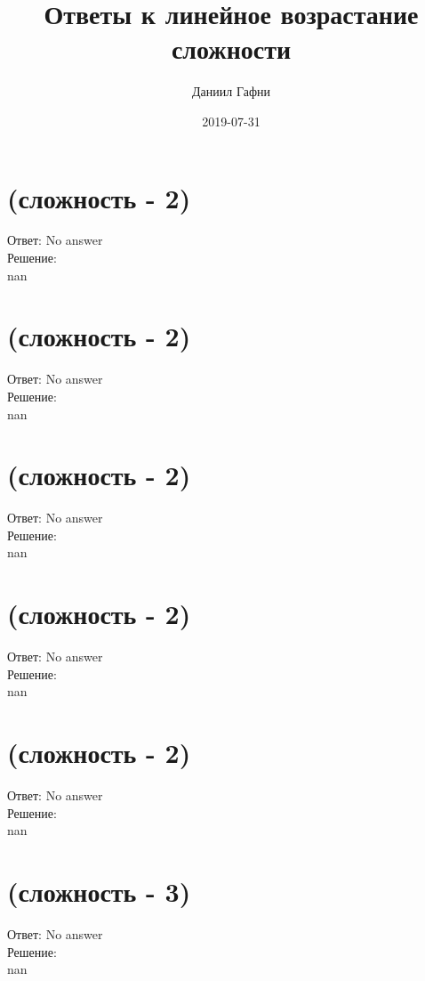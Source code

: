 \documentclass[a4paper,10pt]{article}%
\title{Ответы к линейное возрастание сложности}%
\author{Даниил Гафни}%
\date{2019{-}07{-}31}%
\begin{document}
%
\normalsize%
\maketitle%
\section{(сложность {-} 2)}%
\label{sec:( {-} 2)}%
\hspace{3ex} Ответ: No answer \\%
%
\hspace*{3ex} Решение: \\%
nan

%
\section{(сложность {-} 2)}%
\label{sec:( {-} 2)}%
\hspace{3ex} Ответ: No answer \\%
%
\hspace*{3ex} Решение: \\%
nan

%
\section{(сложность {-} 2)}%
\label{sec:( {-} 2)}%
\hspace{3ex} Ответ: No answer \\%
%
\hspace*{3ex} Решение: \\%
nan

%
\section{(сложность {-} 2)}%
\label{sec:( {-} 2)}%
\hspace{3ex} Ответ: No answer \\%
%
\hspace*{3ex} Решение: \\%
nan

%
\section{(сложность {-} 2)}%
\label{sec:( {-} 2)}%
\hspace{3ex} Ответ: No answer \\%
%
\hspace*{3ex} Решение: \\%
nan

%
\section{(сложность {-} 3)}%
\label{sec:( {-} 3)}%
\hspace{3ex} Ответ: No answer \\%
%
\hspace*{3ex} Решение: \\%
nan
\end{document}
